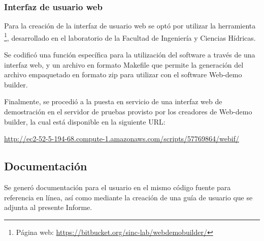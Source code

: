 \documentclass[12pt,bibliography=oldstyle,DIV=12,parskip=half-]{scrreprt}
\begin{document}




%
%
\subsubsection{Interfaz de usuario web}
%
Para la creación de la interfaz de usuario web se optó por utilizar la
herramienta \footnote{Página web:
  \url{https://bitbucket.org/sinc-lab/webdemobuilder/}}, desarrollado
en el laboratorio  de la Facultad de Ingeniería y
Ciencias Hídricas.

Se codificó una función específica  para la utilización
del software a través de una interfaz web, y un archivo en formato
{\mono Makefile} que permite la generación del archivo empaquetado en
formato zip para utilizar con el software Web-demo builder.

Finalmente, se procedió a la puesta en servicio de una interfaz web de
demostración en el servidor de pruebas provisto por los creadores de
Web-demo builder, la cual está disponible en la siguiente URL:

\url{http://ec2-52-5-194-68.compute-1.amazonaws.com/scripts/57769864/webif/}
%
%
\subsection{Documentación}
%
Se generó documentación para el usuario en el mismo código fuente para
referencia en línea, así como mediante la creación de una guía de
usuario que se adjunta al presente Informe.
\end{document}
